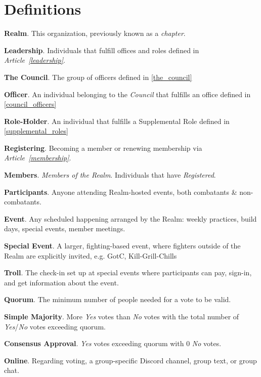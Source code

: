 \documentclass[12pt]{article}
\begin{document}
\section{Definitions}
\begin{level}
    \item \textbf{Realm}. This organization, previously known as a \emph{chapter}.
    \item \textbf{Leadership}. Individuals that fulfill offices and roles defined in \emph{Article~\ref{leadership}}.
    \item \textbf{The Council}. The group of officers defined in \ref{the_council}
    \item \textbf{Officer}. An individual belonging to the \emph{Council} that fulfills an office defined in \ref{council_officers}
    \item \textbf{Role-Holder}. An individual that fulfills a Supplemental Role defined in \ref{supplemental_roles}
    \item \textbf{Registering}. Becoming a member or renewing membership via \emph{Article~\ref{membership}}.
    \item \textbf{Members}. \emph{Members of the Realm}. Individuals that have \emph{Registered}.
    \item \textbf{Participants}. Anyone attending Realm-hosted events, both combatants \& non-combatants.
    \item \textbf{Event}. Any scheduled happening arranged by the Realm: weekly practices, build days, special events, member meetings.
    \item \textbf{Special Event}. A larger, fighting-based event, where fighters outside of the Realm are explicitly invited, e.g. GotC, Kill-Grill-Chills
    \item \textbf{Troll}. The check-in set up at special events where participants can pay, sign-in, and get information about the event.
    \item \textbf{Quorum}. The minimum number of people needed for a vote to be valid.
    \item \textbf{Simple Majority}. More \emph{Yes} votes than \emph{No} votes with the total number of \emph{Yes}/\emph{No} votes exceeding quorum.
    \item \textbf{Consensus Approval}. \emph{Yes} votes exceeding quorum with 0 \emph{No} votes.
    \item \textbf{Online}. Regarding voting, a group-specific Discord channel, group text, or group chat.
\end{level}
\end{document}
